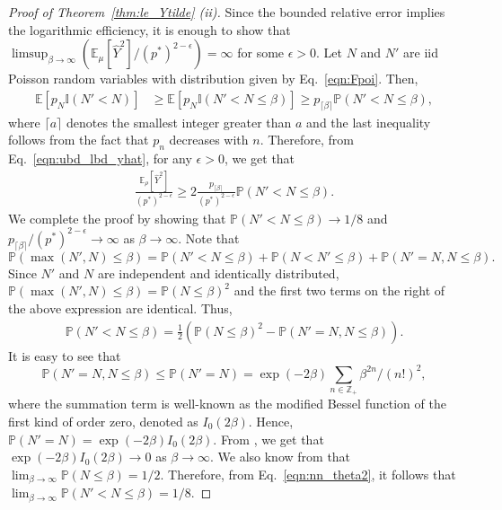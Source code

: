 \documentclass[pdflatex, sn-mathphys-ay]{sn-jnl}%
\newcommand{\intg}{\mathbb{Z}}
\newcommand{\ind}{\mathbb{I}}
\newcommand{\pp}{\mathbb{P}}
\newcommand{\ee}{\mathbb{E}}
\newcommand{\lt}{\left}
\newcommand{\rt}{\right}
\newcommand{\wh}{\widehat}
\theoremstyle{thmstyleone}%
\theoremstyle{thmstyletwo}%
\theoremstyle{thmstylethree}%
\begin{document}
\begin{proof}[Proof of Theorem~\ref{thm:le_Ytilde} (ii)]
Since the bounded relative error implies the logarithmic efficiency, it is enough to show that 
$\limsup_{\beta \to \infty} \lt(\ee_\mu[\wh Y^2]/(p^*)^{2-\epsilon}\rt) = \infty$ for some $\epsilon > 0$.
Let $N$ and $N'$ are iid Poisson random variables with distribution given by Eq.~\eqref{eqn:Fpoi}. Then,  
\begin{align*}
    \ee\lt[p_{N} \ind(N' < N)\rt] &\geq \ee\lt[p_{N} \ind(N' < N \leq \beta)\rt] 
    \geq p_{\lceil \beta \rceil}\pp(N' < N \leq \beta ),
\end{align*}
where $\lceil a \rceil$ denotes the smallest integer greater than $a$ and the last inequality follows from the fact that $p_n$ decreases with $n$. Therefore, from Eq.~\eqref{eqn:ubd_lbd_yhat}, for any $\epsilon > 0$, we get that
\begin{align}
\frac{\ee_\rho\lt[\wh Y^2\rt]}{(p^*)^{2 - \epsilon}} \geq 2 \frac{p_{\lceil \beta \rceil}}{(p^*)^{2-\epsilon}} \pp(N' < N \leq \beta ). \label{eqn:log-eff-yhat2}
\end{align}
We complete the proof by showing that $\pp(N' < N \leq \beta ) \to 1/8$ and $p_{\lceil \beta \rceil}/(p^*)^{2-\epsilon} \to \infty$ as $\beta \to \infty$.
Note that 
\[
\pp(\max(N', N) \leq \beta) = \pp(N' < N \leq \beta) + \pp(N < N' \leq \beta) + \pp(N' = N, N \leq \beta).
\]
Since $N'$ and $N$ are independent and identically distributed, $\pp(\max(N', N) \leq \beta) = \pp(N \leq \beta)^2$ and the first two terms on the right of the above expression are identical. Thus, 
\begin{align}
\pp(N' < N \leq \beta) = \frac{1}{2}\lt(\pp(N \leq \beta)^2 - \pp(N' = N, N \leq \beta)\rt).
\label{eqn:nn_theta2}
\end{align}
It is easy to see that 
\[
\pp(N' = N, N \leq \beta) \leq \pp(N' = N) = \exp(- 2\beta) \sum_{n \in \intg_+} \beta^{2n}/(n!)^2,
\]
where the summation term is well-known as the modified Bessel function of {  the first kind of order zero}, denoted as $I_0(2\beta)$. Hence, $\pp(N' = N) = \exp(- 2\beta) I_0(2\beta)$.
From \cite{kasperkovitz1980asymptotic}, we get that $\exp(- 2\beta) I_0(2\beta) \to 0$ as $\beta \to \infty$. We also know from \cite{short2013improved} that 
$\lim_{\beta \to \infty} \pp(N \leq \beta)
= 1/2$.
Therefore, from Eq.~\eqref{eqn:nn_theta2}, it follows that 
$\lim_{\beta \to \infty}\pp(N' < N \leq \beta) = 1/8$.


\end{proof}
\end{document}
